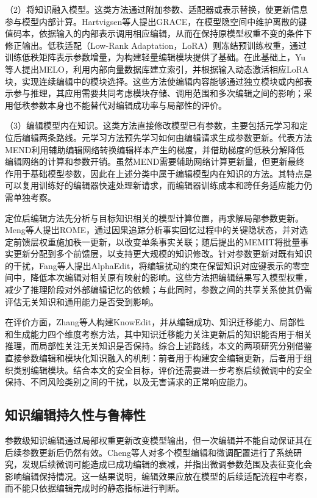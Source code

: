 （2）将知识融入模型。这类方法通过附加参数、适配器或表示替换，使更新信息参与模型内部计算。Hartvigsen等人提出GRACE，在模型隐空间中维护离散的键值码本，依据输入的内部表示调用相应编辑，从而在保持原模型权重不变的条件下修正输出\cite{hartvigsen2023grace}。低秩适配（Low-Rank Adaptation，LoRA）则冻结预训练权重，通过训练低秩矩阵表示参数增量，为构建轻量编辑模块提供了基础\cite{hu2022lora}。在此基础上，Yu等人提出MELO，利用内部向量数据库建立索引，并根据输入动态激活相应LoRA块，实现连续编辑中的模块选择\cite{yu2024melo}。这些方法使编辑内容能够通过独立模块或内部表示参与推理，其应用需要共同考虑模块存储、调用范围和多次编辑之间的影响；采用低秩参数本身也不能替代对编辑成功率与局部性的评价。

（3）编辑模型内在知识。这类方法直接修改模型已有参数，主要包括元学习和定位后编辑两条路线。元学习方法预先学习如何由编辑请求生成参数更新。代表方法MEND利用辅助编辑网络转换编辑样本产生的梯度，并借助梯度的低秩分解降低编辑网络的计算和参数开销\cite{mitchell2022mend}。虽然MEND需要辅助网络计算更新量，但更新最终作用于基础模型参数，因此在上述分类中属于编辑模型内在知识的方法。其特点是可以复用训练好的编辑器快速处理新请求，而编辑器训练成本和跨任务适应能力仍需单独考察。

定位后编辑方法先分析与目标知识相关的模型计算位置，再求解局部参数更新。Meng等人提出ROME，通过因果追踪分析事实回忆过程中的关键隐状态，并对选定前馈层权重施加秩一更新，以改变单条事实关联\cite{meng2022rome}；随后提出的MEMIT将批量事实更新分配到多个前馈层，以支持更大规模的知识修改\cite{meng2023memit}。针对参数更新对既有知识的干扰，Fang等人提出AlphaEdit，将编辑扰动约束在保留知识对应键表示的零空间中，降低本次编辑对相关原有映射的影响\cite{fang2024alphaedit}。这些方法把编辑结果写入模型权重，减少了推理阶段对外部编辑记忆的依赖；与此同时，参数之间的共享关系使其仍需评估无关知识和通用能力是否受到影响。

在评价方面，Zhang等人构建KnowEdit，并从编辑成功、知识迁移能力、局部性和生成能力四个维度考察方法，其中知识迁移能力关注更新后的知识能否用于相关推理，而局部性关注无关知识是否保持\cite{zhang2024comprehensive}。综合上述路线，本文的两项研究分别借鉴直接参数编辑和模块化知识融入的机制：前者用于构建安全编辑更新，后者用于组织类别编辑模块。结合本文的安全目标，评价还需要进一步考察后续微调中的安全保持、不同风险类别之间的干扰，以及无害请求的正常响应能力。

\subsection{知识编辑持久性与鲁棒性}

参数级知识编辑通过局部权重更新改变模型输出，但一次编辑并不能自动保证其在后续参数更新后仍然有效。Cheng等人对多个模型编辑和微调配置进行了系统研究，发现后续微调可能造成已成功编辑的衰减，并指出微调参数范围及表征变化会影响编辑保持情况\cite{cheng2025finetune}。这一结果说明，编辑效果应放在模型的后续适配流程中考察，而不能只依据编辑完成时的静态指标进行判断。


